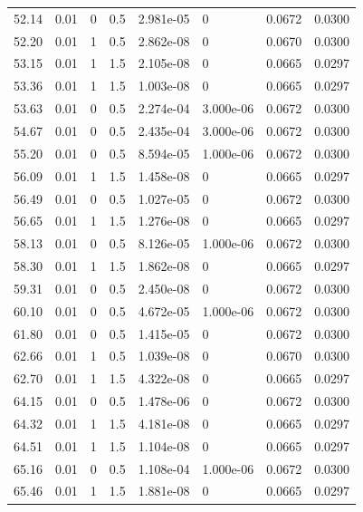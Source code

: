 \documentclass[preview]{standalone}
\begin{document}
{{{\begin{tabular}{L{1.2cm}C{1.2cm} C{0.3cm}C{0.5cm} C{1.4cm}C{1.4cm} C{1.4cm}C{1.4cm}}
  52.14  &  0.01  & 0     & 0.5 &  2.981e-05  & 0  & 0.0672 &  0.0300   \\ 
  52.20  &  0.01  & 1     & 0.5 &  2.862e-08  & 0  & 0.0670 &  0.0300   \\ 
  53.15  &  0.01  & 1     & 1.5 &  2.105e-08  & 0  & 0.0665 &  0.0297   \\ 
  53.36  &  0.01  & 1     & 1.5 &  1.003e-08  & 0  & 0.0665 &  0.0297   \\ 
  53.63  &  0.01  & 0     & 0.5 &  2.274e-04  & 3.000e-06  & 0.0672 &  0.0300   \\ 
  54.67  &  0.01  & 0     & 0.5 &  2.435e-04  & 3.000e-06  & 0.0672 &  0.0300   \\ 
  55.20  &  0.01  & 0     & 0.5 &  8.594e-05  & 1.000e-06  & 0.0672 &  0.0300   \\ 
  56.09  &  0.01  & 1     & 1.5 &  1.458e-08  & 0  & 0.0665 &  0.0297   \\ 
  56.49  &  0.01  & 0     & 0.5 &  1.027e-05  & 0  & 0.0672 &  0.0300   \\ 
  56.65  &  0.01  & 1     & 1.5 &  1.276e-08  & 0  & 0.0665 &  0.0297   \\ 
  58.13  &  0.01  & 0     & 0.5 &  8.126e-05  & 1.000e-06  & 0.0672 &  0.0300   \\ 
  58.30  &  0.01  & 1     & 1.5 &  1.862e-08  & 0  & 0.0665 &  0.0297   \\ 
  59.31  &  0.01  & 0     & 0.5 &  2.450e-08  & 0  & 0.0672 &  0.0300   \\ 
  60.10  &  0.01  & 0     & 0.5 &  4.672e-05  & 1.000e-06  & 0.0672 &  0.0300   \\ 
  61.80  &  0.01  & 0     & 0.5 &  1.415e-05  & 0  & 0.0672 &  0.0300   \\ 
  62.66  &  0.01  & 1     & 0.5 &  1.039e-08  & 0  & 0.0670 &  0.0300   \\ 
  62.70  &  0.01  & 1     & 1.5 &  4.322e-08  & 0  & 0.0665 &  0.0297   \\ 
  64.15  &  0.01  & 0     & 0.5 &  1.478e-06  & 0  & 0.0672 &  0.0300   \\ 
  64.32  &  0.01  & 1     & 1.5 &  4.181e-08  & 0  & 0.0665 &  0.0297   \\ 
  64.51  &  0.01  & 1     & 1.5 &  1.104e-08  & 0  & 0.0665 &  0.0297   \\ 
  65.16  &  0.01  & 0     & 0.5 &  1.108e-04  & 1.000e-06  & 0.0672 &  0.0300   \\ 
  65.46  &  0.01  & 1     & 1.5 &  1.881e-08  & 0  & 0.0665 &  0.0297   \\ 

\end{tabular}}}}
\end{document}
